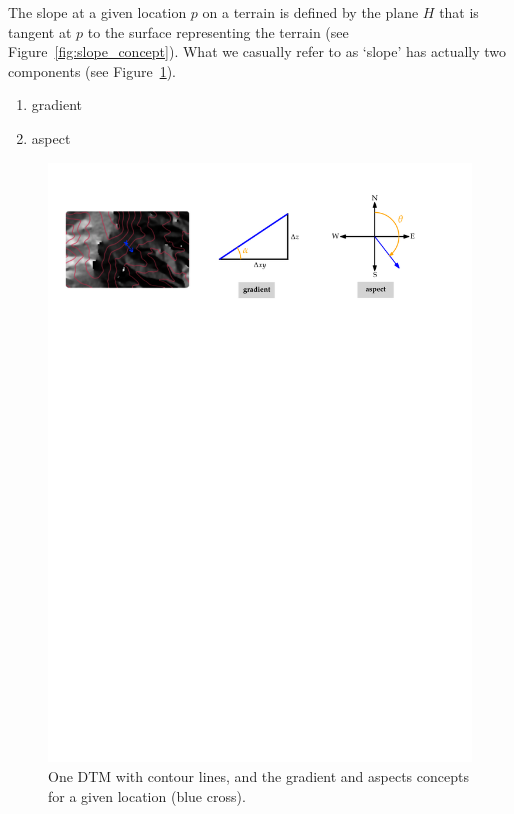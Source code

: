 The slope at a given location $p$ on a terrain is defined by the plane $H$ that is tangent at $p$ to the surface representing the terrain (see Figure~\ref{fig:slope_concept}).
What we casually refer to as `slope' has actually two components (see Figure~\ref{fig:slope_aspect}).%
\begin{enumerate}
  \item gradient 
  \item aspect 
\end{enumerate}
\begin{figure}
  \centering
  \includegraphics[width=\linewidth]{figs/slope_aspect}
  \caption{One DTM with contour lines, and the gradient and aspects concepts for a given location (blue cross).}%
\label{fig:slope_aspect}
\end{figure}


